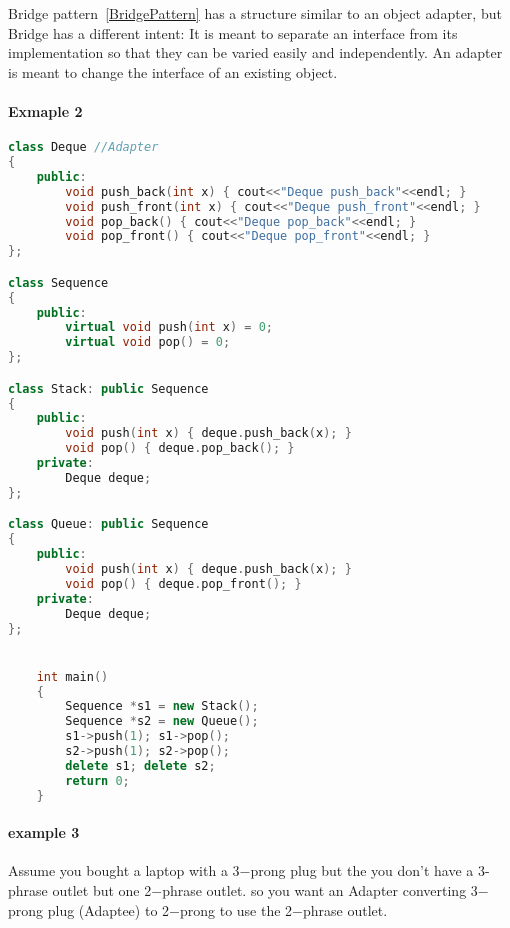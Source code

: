 \documentclass{book}
\begin{document}
Bridge pattern~\ref{BridgePattern} has a structure similar to an object adapter, but Bridge has a different intent:
It is meant to separate an interface from its implementation so that they can be varied easily and independently.
An adapter is meant to change the interface of an existing object.

\paragraph{Exmaple 2}

\begin{lstlisting}[caption={Bridge Pattern sample code 2},label={lst:bridgepsc2},language=C++]
class Deque //Adapter 
{  
    public:  
        void push_back(int x) { cout<<"Deque push_back"<<endl; }  
        void push_front(int x) { cout<<"Deque push_front"<<endl; }  
        void pop_back() { cout<<"Deque pop_back"<<endl; }  
        void pop_front() { cout<<"Deque pop_front"<<endl; }  
};  

class Sequence  
{  
    public:  
        virtual void push(int x) = 0;  
        virtual void pop() = 0;  
};  

class Stack: public Sequence  
{  
    public:  
        void push(int x) { deque.push_back(x); }  
        void pop() { deque.pop_back(); }  
    private:  
        Deque deque;
};  

class Queue: public Sequence  
{  
    public:  
        void push(int x) { deque.push_back(x); }  
        void pop() { deque.pop_front(); }  
    private:  
        Deque deque;
};  


    int main()  
    {  
        Sequence *s1 = new Stack();  
        Sequence *s2 = new Queue();  
        s1->push(1); s1->pop();  
        s2->push(1); s2->pop();  
        delete s1; delete s2;  
        return 0;  
    }  
\end{lstlisting}

\paragraph{example 3}
Assume you bought a laptop with a 3$-$prong plug but the you don't have a 3-phrase outlet but one 2$-$phrase outlet.
so you want an Adapter converting 3$-$prong plug (Adaptee) to 2$-$prong to use the 2$-$phrase outlet.
\end{document}
